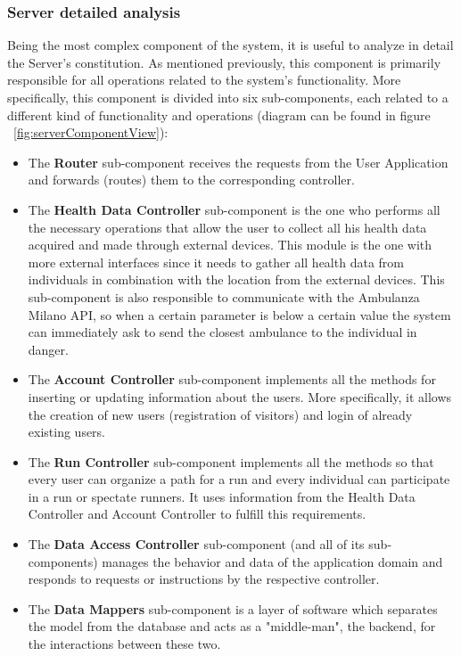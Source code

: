 \documentclass[12pt]{article}
\begin{document}
\subsubsection{Server detailed analysis}

\vspace{3mm}
\noindent Being the most complex component of the system, it is useful to analyze in detail the Server's 
constitution. As mentioned previously, this component is primarily responsible for all operations related 
to the system's functionality. More specifically, this component is divided into six sub-components, each 
related to a different kind of functionality and operations (diagram can be found in figure ~\ref{fig:serverComponentView}):

\begin{itemize}
    \item The \textbf{Router} sub-component receives the requests from the User Application and forwards (routes) them to the corresponding controller.
    \item The \textbf{Health Data Controller} sub-component is the one who performs all the necessary
          operations that allow the user to collect all his health data acquired and made through external devices. This module is the one with more external interfaces since it needs to gather all health data from individuals in combination with the location from the external devices. This sub-component is also responsible to communicate with the Ambulanza Milano API, so when a certain parameter is below a certain value the system can immediately ask to send the closest ambulance to the individual in danger. 
    \item The \textbf{Account Controller} sub-component implements all the methods for inserting or updating information about the users. More specifically, it allows the creation of new users (registration of visitors) and login of already existing users.
    \item The \textbf{Run Controller} sub-component implements all the methods so that every user can organize a path for a run and every individual can participate in a run or spectate runners. It uses information from the Health Data Controller and Account Controller to fulfill this requirements.

    \item The \textbf{Data Access Controller} sub-component (and all of its sub-components) manages the behavior and data of the application domain and responds to requests or instructions by the respective controller.
    \item The \textbf{Data Mappers} sub-component is a layer of software which separates the model from the database and acts as a "middle-man", the backend, for the interactions between these two.
\end{itemize}
\end{document}
